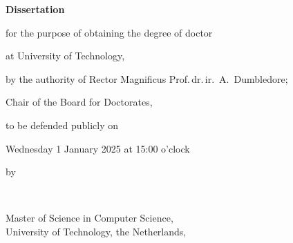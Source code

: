 \begin{titlepage}



\thispagestyle{empty}
\begin{center}

\printtitle

\end{center}

\cleardoublepage




\thispagestyle{empty}
\begin{center}

\printtitle


\vfill

{\Large\titlefont\bfseries Dissertation}

\bigskip
\bigskip

for the purpose of obtaining the degree of doctor

at University of Technology,

by the authority of Rector Magnificus Prof.\,dr.\,ir.\ A.\ Dumbledore;

Chair of the Board for Doctorates,

to be defended publicly on

Wednesday 1 January 2025 at 15:00 o'clock

\bigskip
\bigskip

by

\bigskip
\bigskip

\makeatletter
{\Large\titlefont\bfseries\@firstname\ \textsc{\@lastname}}
\makeatother

\bigskip
\bigskip

Master of Science in Computer Science, \\
University of Technology, the Netherlands,


\end{center}
\end{titlepage}
